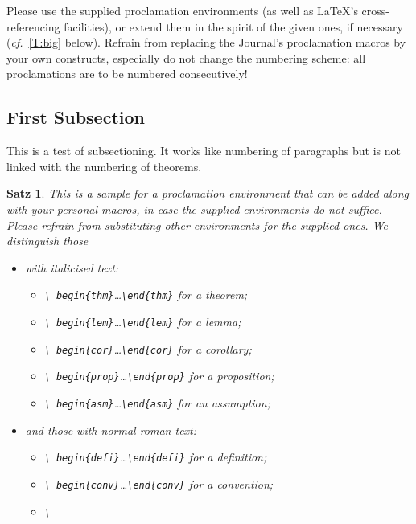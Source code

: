 \documentclass{lmcs} %
\theoremstyle{plain}\newtheorem{satz}[thm]{Satz} %
\def\cf{{\em cf.}}
\begin{document}
  Please use the supplied proclamation environments (as well as
  LaTeX's cross-referencing facilities), or extend them in the spirit
  of the given ones, if necessary (\cf~\autoref{T:big} below).
  Refrain from replacing the Journal's proclamation macros by your own
  constructs, especially do not change the numbering scheme: all
  proclamations are to be numbered consecutively!

\subsection{First Subsection}

  This is a test of subsectioning.  It works like numbering of
  paragraphs but is not linked with the numbering of theorems.

\begin{satz}\label{T:big}
  This is a sample for a proclamation environment that can be added
  along with your personal macros, \emph{in case the supplied
    environments do not suffice}.  Please refrain from substituting
  other environments for the supplied ones.  We distinguish those
\begin{itemize}
\item with italicised text:
\begin{itemize}
\item\emph{\texttt{\textbackslash
    begin\{thm\}}\dots\texttt{\textbackslash end\{thm\}}} for a theorem;
\item\emph{\texttt{\textbackslash
    begin\{lem\}}\dots\texttt{\textbackslash end\{lem\}}} for a lemma;
\item\emph{\texttt{\textbackslash
    begin\{cor\}}\dots\texttt{\textbackslash end\{cor\}}} for a corollary;
\item\emph{\texttt{\textbackslash
    begin\{prop\}}\dots\texttt{\textbackslash end\{prop\}}} for a proposition;
\item\emph{\texttt{\textbackslash
    begin\{asm\}}\dots\texttt{\textbackslash end\{asm\}}} for an
  assumption;
\end{itemize}
\item  and those with normal roman text:
\begin{itemize}
\item\emph{\texttt{\textbackslash
    begin\{defi\}}\dots\texttt{\textbackslash end\{defi\}}} for a definition;
\item\emph{\texttt{\textbackslash
    begin\{conv\}}\dots\texttt{\textbackslash end\{conv\}}} for a convention;
\item\emph{\texttt{\textbackslash
}}
\end{itemize}
\end{itemize}
\end{satz}
\end{document}
